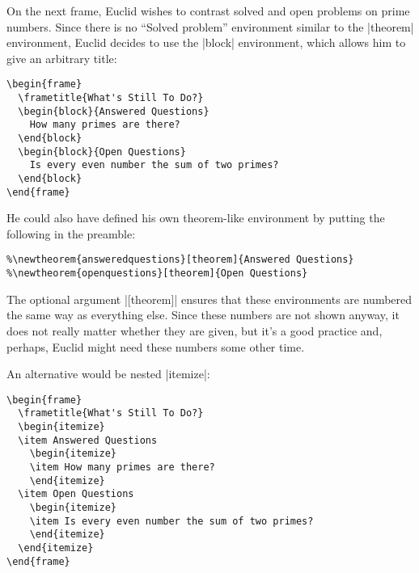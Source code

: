 On the next frame, Euclid wishes to contrast solved and open problems on prime numbers. Since there is no ``Solved problem'' environment similar to the |theorem| environment, Euclid decides to use the |block| environment, which allows him to give an arbitrary title:
\begin{verbatim}
\begin{frame}
  \frametitle{What's Still To Do?}
  \begin{block}{Answered Questions}
    How many primes are there?
  \end{block}
  \begin{block}{Open Questions}
    Is every even number the sum of two primes?
  \end{block}
\end{frame}
\end{verbatim}

He could also have defined his own theorem-like environment by putting the following in the preamble:
\begin{verbatim}
%\newtheorem{answeredquestions}[theorem]{Answered Questions}
%\newtheorem{openquestions}[theorem]{Open Questions}
\end{verbatim}
The optional argument |[theorem]| ensures that these environments are numbered the same way as everything else. Since these numbers are not shown anyway, it does not really matter whether they are given, but it's a good practice and, perhaps, Euclid might need these numbers some other time.

An alternative would be nested |itemize|:
\begin{verbatim}
\begin{frame}
  \frametitle{What's Still To Do?}
  \begin{itemize}
  \item Answered Questions
    \begin{itemize}
    \item How many primes are there?
    \end{itemize}
  \item Open Questions
    \begin{itemize}
    \item Is every even number the sum of two primes?
    \end{itemize}
  \end{itemize}
\end{frame}
\end{verbatim}

